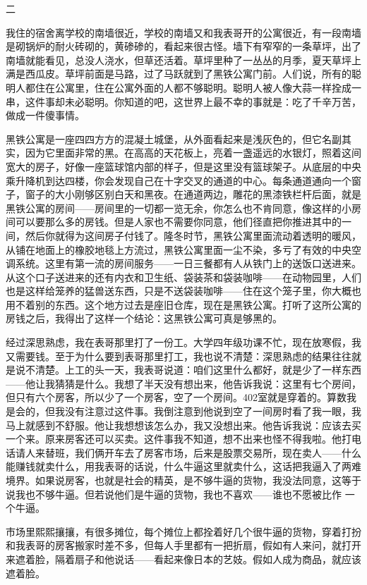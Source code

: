 二 

我住的宿舍离学校的南墙很近，学校的南墙又和我表哥开的公寓很近，有一段南墙是砌锅炉的耐火砖砌的，黄碜碜的，看起来很古怪。墙下有窄窄的一条草坪，出了南墙就能看见，总没人浇水，但草还活着。草坪里种了一丛丛的月季，夏天草坪上满是西瓜皮。草坪前面是马路，过了马跃就到了黑铁公寓门前。人们说，所有的聪明人都住在公寓里，住在公寓外面的人都不够聪明。聪明人被人像大蒜一样拴成一串，这件事却未必聪明。你知道的吧，这世界上最不幸的事就是：吃了千辛万苦，做成一件傻事情。 

黑铁公寓是一座四四方方的混凝土城堡，从外面看起来是浅灰色的，但它名副其实，因为它里面非常的黑。在高高的天花板上，亮着一盏遥远的水银灯，照着这间宽大的房子，好像一座篮球馆内部的样子，但是这里没有篮球架子。从底层的中央乘升降机到达四楼，你会发现自己在十字交叉的通道的中心。每条通道通向一个窗子，窗子的大小刚够区别白天和黑夜。在通道两边，雕花的黑漆铁栏杆后面，就是黑铁公寓的房间——房间里的一切都一览无余，你怎么也不肯同意，像这样的小房间可以要那么多的房钱。但是人家也不需要你同意，他们径直把你推进其中的一间，然后你就得为这间房子付钱了。隆冬时节，黑铁公寓里面流动着透明的暖风，从铺在地面上的橡胶地毯上方流过，黑铁公寓里面一尘不染，多亏了有效的中央空调系统。这里有第一流的房间服务——一日三餐都有人从铁门上的送饭口送进来。从这个口子送进来的还有内衣和卫生纸、袋装茶和袋装咖啡——在动物园里，人们也是这样给笼养的猛兽送东西，只是不送袋装咖啡——住在这个笼子里，你大概也用不着别的东西。这个地方过去是座旧仓库，现在是黑铁公寓。打听了这所公寓的房钱之后，我得出了这样一个结论：这黑铁公寓可真是够黑的。 

经过深思熟虑，我在表哥那里打了一份工。大学四年级功课不忙，现在放寒假，我又需要钱。至于为什么要到表哥那里打工，我也说不清楚：深思熟虑的结果往往就是说不清楚。上工的头一天，我表哥说道：咱们这里什么都好，就是少了一样东西——他让我猜猜是什么。我想了半天没有想出来，他告诉我说：这里有七个房间，但只有六个房客，所以少了一个房客，空了一个房间。402室就是穿着的。算数我是会的，但我没有注意过这件事。我倒注意到他说到空了一间房时看了我一眼，我马上就感到不舒服。他让我想想该怎么办，我又没想出来。他告诉我说：应该去买一个来。原来房客还可以买卖。这件事我不知道，想不出来也怪不得我啦。他打电话请人来替班，我们俩开车去了房客市场，后来是股票交易所，现在卖人——什么能赚钱就卖什么，用我表哥的话说，什么牛逼这里就卖什么，这话把我逼入了两难境界。如果说房客，也就是社会的精英，是不够牛逼的货物，我没法同意，这等于说我也不够牛逼。但若说他们是牛逼的货物，我也不喜欢——谁也不愿被比作 一个牛逼。 



市场里熙熙攘攘，有很多摊位，每个摊位上都拴着好几个很牛逼的货物，穿着打扮和我表哥的房客搬家时差不多，但每人手里都有一把折扇，假如有人来问，就打开来遮着脸，隔着扇子和他说话——看起来像日本的艺妓。假如人成为商品，就应该遮着脸。 

